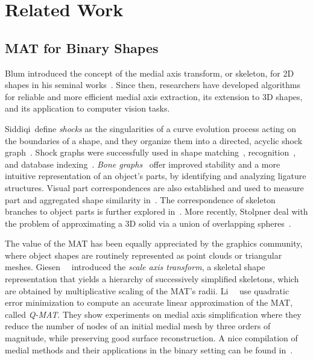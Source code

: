 \documentclass[10pt,twocolumn,letterpaper]{article}
\begin{document}
\section{Related Work}\label{sec:related}
\subsection{MAT for Binary Shapes}\label{sec:related:binary}
Blum introduced the concept of the medial axis transform, or skeleton, for 2D shapes
in his seminal works~\cite{blum1967transformation,blum1973biological}.
Since then, researchers have developed algorithms for reliable
and more efficient medial axis extraction, its extension to 3D shapes, and its application
to computer vision tasks.

Siddiqi~\etal define \emph{shocks} as the singularities of a curve evolution process acting on the boundaries of
a shape, and they organize them into a directed, acyclic shock graph~\cite{siddiqi1999shock}.
Shock graphs were successfully used in shape matching~\cite{siddiqi1999shock}, recognition~\cite{sebastian2001recognition},
and database indexing~\cite{sebastian2002shock}.
\emph{Bone graphs}~\cite{macrini2008skeletons} offer improved stability and a more intuitive representation of an object's parts, 
by identifying and analyzing ligature structures.
Visual part correspondences are also established and used to measure part and aggregated shape similarity in~\cite{latecki2000shape}.
The correspondence of skeleton branches to object parts is further explored in~\cite{ling2007shape,bai2008path}.
More recently, Stolpner \etal deal with the problem of approximating a 3D solid via a union
of overlapping spheres~\cite{stolpner2012medial}.

The value of the MAT has been equally appreciated by the graphics community, where object shapes 
are routinely represented as point clouds or triangular meshes.
Giesen~\etal~\cite{giesen2009scale} introduced the \emph{scale axis transform}, a skeletal shape representation
that yields a hierarchy of successively simplified skeletons, which are obtained by multiplicative scaling of the
MAT's radii.
Li~\etal~\cite{li2015q} use quadratic error minimization to compute an accurate linear approximation of the MAT, called \emph{Q-MAT}.
They show experiments on medial axis simplification where they reduce the number of nodes of an initial medial mesh
by three orders of magnitude, while preserving good surface reconstruction.
A nice compilation of medial methods and their applications in the binary setting can be found in~\cite{siddiqi2008medial}.
\end{document}
